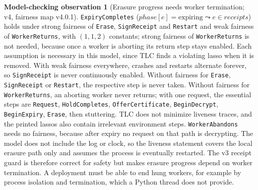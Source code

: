 \documentclass[pdflatex,sn-mathphys-num]{sn-jnl}
\theoremstyle{plain}
\theoremstyle{definition}
\newtheorem{observation}{Model-checking observation}
\newcommand{\code}[1]{\texttt{#1}}
\begin{document}
\begin{observation}[Erasure progress needs worker termination; v4, fairness map v4.0.1]\label{obs:liveness}
\code{ExpiryCompletes} ($\mathit{phase}[e]=\text{expiring}\leadsto e\in\mathit{receipts}$) holds under strong fairness of \code{Erase}, \code{SignReceipt} and \code{Restart} and weak fairness of \code{WorkerReturns}, with $(1,1,2)$ constants; strong fairness of \code{WorkerReturns} is not needed, because once a worker is aborting its return step stays enabled. Each assumption is necessary in this model, since TLC finds a violating lasso when it is removed. With weak fairness everywhere, crashes and restarts alternate forever, so \code{SignReceipt} is never continuously enabled. Without fairness for \code{Erase}, \code{SignReceipt} or \code{Restart}, the respective step is never taken. Without fairness for \code{WorkerReturns}, an aborting worker never returns; with one request, the essential steps are \code{Request}, \code{HoldCompletes}, \code{OfferCertificate}, \code{BeginDecrypt}, \code{BeginExpiry}, \code{Erase}, then stuttering. TLC does not minimize liveness traces, and the printed lassos also contain irrelevant environment steps. \code{WorkerAbandons} needs no fairness, because after expiry no request on that path is decrypting. The model does not include the log or clock, so the liveness statement covers the local erasure path only and assumes the process is eventually restarted. The v3 receipt guard is therefore correct for safety but makes erasure progress depend on worker termination. A deployment must be able to end hung workers, for example by process isolation and termination, which a Python thread does not provide.
\end{observation}
\end{document}
